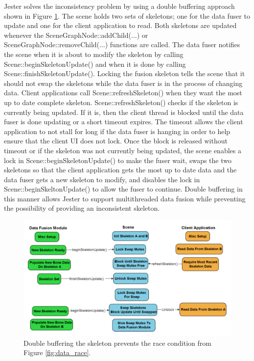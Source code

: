 Jester solves the inconsistency problem by using a double buffering approach shown in Figure \ref{fig:double_buffer}. The scene holds two sets of skeletons; one for the data fuser to update and one for the client application to read. Both skeletons are updated whenever the \mbox{SceneGraphNode::addChild(...)} or \mbox{SceneGraphNode::removeChild(...)} functions are called. The data fuser notifies the scene when it is about to modify the skeleton by calling \mbox{Scene::beginSkeletonUpdate()} and when it is done by calling \mbox{Scene::finishSkeletonUpdate()}. Locking the fusion skeleton tells the scene that it should not swap the skeletons while the data fuser is in the process of changing data. Client applications call \mbox{Scene::refreshSkeleton()} when they want the most up to date complete skeleton. \mbox{Scene::refreshSkeleton()} checks if the skeleton is currently being updated. If it is, then the client thread is blocked until the data fuser is done updating or a short timeout expires. The timeout allows the client application to not stall for long if the data fuser is hanging in order to help ensure that the client UI does not lock. Once the block is released without timeout or if the skeleton was not currently being updated, the scene enables a lock in \mbox{Scene::beginSkeletonUpdate()} to make the fuser wait, swaps the two skeletons so that the client application gets the most up to date data and the data fuser gets a new skeleton to modify, and disables the lock in \mbox{Scene::beginSkeltonUpdate()} to allow the fuser to continue. Double buffering in this manner allows Jester to support multithreaded data fusion while preventing the possibility of providing an inconsistent skeleton.

\begin{figure}[]
\centering
\includegraphics[width=1\textwidth]{figures/doubleBuffer}
\caption{Double buffering the skeleton prevents the race condition from Figure \ref{fig:data_race}.}
\label{fig:double_buffer}
\end{figure}


